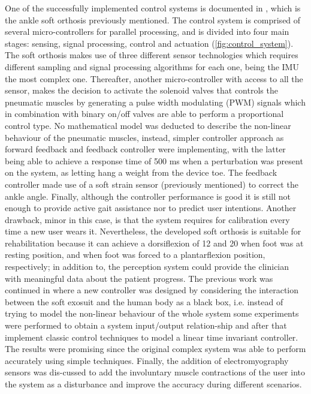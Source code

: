 One of the successfully implemented control systems is documented in \cite{park2011bio}, which is the ankle soft orthosis previously mentioned. The control system is comprised of several micro-controllers for parallel processing, and is divided into four main stages: sensing, signal processing, control and actuation (\autoref{fig:control_system}). The soft orthosis makes use of three different sensor technologies which requires different sampling and signal processing algorithms for each one, being the IMU the most complex one. Thereafter, another micro-controller with access to all the sensor, makes the decision to activate the solenoid valves that controls the pneumatic muscles by generating a pulse width modulating (PWM) signals which in combination with binary on/off valves are able to perform a proportional control type. No mathematical model was deducted to describe the non-linear behaviour of the pneumatic muscles, instead, simpler controller approach as forward feedback and feedback controller were implementing, with the latter being able to achieve a response time of 500 ms when a perturbation was present on the system, as letting hang a weight from the device toe. The feedback controller made use of a soft strain sensor (previously mentioned) to correct the ankle angle. Finally, although the controller performance is good it is still not enough to provide active gait assistance nor to predict user intentions. Another drawback, minor in this case, is that the system requires for calibration every time a new user wears it. Nevertheless, the developed soft orthosis is suitable for rehabilitation because it can achieve a dorsiflexion of 12\textdegree{} and 20\textdegree{} when foot was at resting position, and when foot was forced to a plantarflexion position, respectively; in addition to, the perception system could provide the clinician with meaningful data about the patient progress. The previous work was continued in \cite{park2014design} where a new controller was designed by considering the interaction between the soft exosuit and the human body as a black box, i.e. instead of trying to model the non-linear behaviour of the whole system some experiments were performed to obtain a system input/output relation-ship and after that implement classic control techniques to model a linear time invariant controller. The results were promising since the original complex system was able to perform accurately using simple techniques. Finally, the addition of electromyography sensors was dis-cussed to add the involuntary muscle contractions of the user into the system as a disturbance and improve the accuracy during different scenarios.

